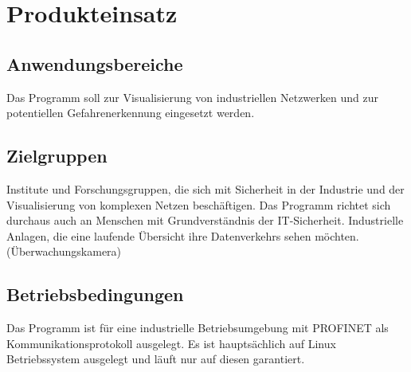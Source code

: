 \chapter{Produkteinsatz}

\section{Anwendungsbereiche}
Das Programm soll zur Visualisierung von industriellen Netzwerken und zur potentiellen Gefahrenerkennung eingesetzt werden.

\section{Zielgruppen}
Institute und Forschungsgruppen, die sich mit Sicherheit in der Industrie und der Visualisierung von komplexen Netzen beschäftigen. Das Programm richtet sich durchaus auch an Menschen mit Grundverständnis der IT-Sicherheit.\newline\newline
Industrielle Anlagen, die eine laufende Übersicht ihre Datenverkehrs sehen möchten. (Überwachungskamera)

\section{Betriebsbedingungen}
Das Programm ist für eine industrielle Betriebsumgebung mit PROFINET als Kommunikationsprotokoll ausgelegt. Es ist hauptsächlich auf Linux Betriebssystem ausgelegt und läuft nur auf diesen garantiert.